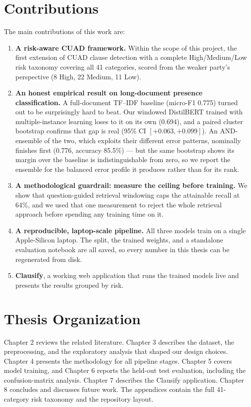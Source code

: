 \section{Contributions}
The main contributions of this work are:
\begin{enumerate}[itemsep=2pt]
  \item \textbf{A risk-aware CUAD framework.} Within the scope of this project, the first extension of CUAD clause detection with a complete High/Medium/Low risk taxonomy covering all 41 categories, scored from the weaker party's perspective (8 High, 22 Medium, 11 Low).
  \item \textbf{An honest empirical result on long-document presence classification.} A full-document TF--IDF baseline (micro-F1 0.775) turned out to be surprisingly hard to beat. Our windowed DistilBERT trained with multiple-instance learning loses to it on its own (0.694), and a paired cluster bootstrap confirms that gap is real (95\% CI $[+0.063, +0.099]$). An AND-ensemble of the two, which exploits their different error patterns, nominally finishes first (0.776, accuracy 85.5\%) --- but the same bootstrap shows its margin over the baseline is indistinguishable from zero, so we report the ensemble for the balanced error profile it produces rather than for its rank.
  \item \textbf{A methodological guardrail: measure the ceiling before training.} We show that question-guided retrieval windowing caps the attainable recall at 64\%, and we used that one measurement to reject the whole retrieval approach before spending any training time on it.
  \item \textbf{A reproducible, laptop-scale pipeline.} All three models train on a single Apple-Silicon laptop. The split, the trained weights, and a standalone evaluation notebook are all saved, so every number in this thesis can be regenerated from disk.
  \item \textbf{Clausify}, a working web application that runs the trained models live and presents the results grouped by risk.
\end{enumerate}

\section{Thesis Organization}
Chapter 2 reviews the related literature. Chapter 3 describes the dataset, the preprocessing, and the exploratory analysis that shaped our design choices. Chapter 4 presents the methodology for all pipeline stages. Chapter 5 covers model training, and Chapter 6 reports the held-out test evaluation, including the confusion-matrix analysis. Chapter 7 describes the Clausify application. Chapter 8 concludes and discusses future work. The appendices contain the full 41-category risk taxonomy and the repository layout.

